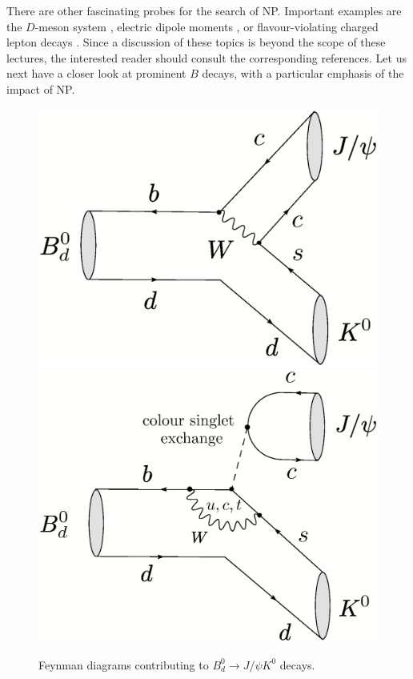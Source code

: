 \documentclass[11pt]{cernrep}
\begin{document}
There are other fascinating probes for the search of NP. Important examples are 
the $D$-meson system \cite{petrov}, electric dipole moments \cite{PR}, or 
flavour-violating charged lepton decays \cite{CEPRT}. Since a discussion of
these topics is beyond the scope of these lectures, the interested reader should consult 
the corresponding references. Let us next have a closer look at prominent $B$ 
decays, with a particular emphasis of the impact of NP.  


\begin{figure}[t]
\centerline{
 \includegraphics[width=5.7truecm]{B0dtoK0Jpsi-tree.ps}
 \hspace*{0.5truecm}
 \includegraphics[width=5.7truecm]{B0dtoK0Jpsi-pen.ps}  
 }
 \vspace*{-0.3truecm}
\caption{Feynman diagrams contributing to $B^0_d\to J/\psi K^0$ 
decays.}\label{fig:BpsiK-diag}
\end{figure}
\end{document}
